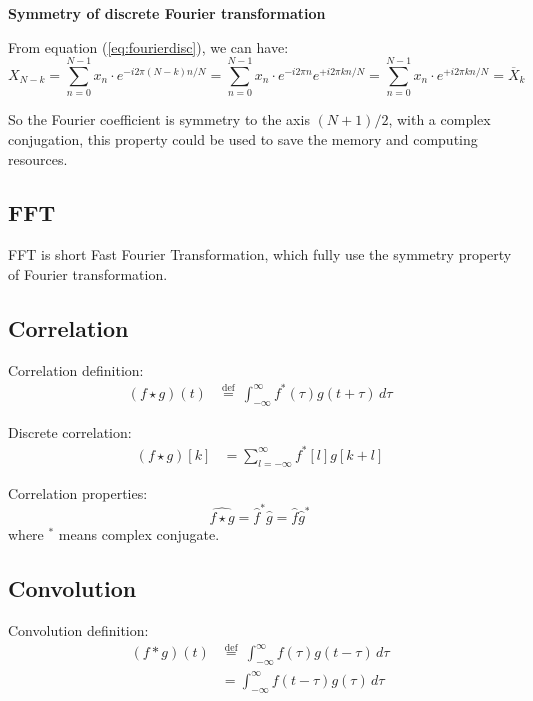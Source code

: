 \documentclass[12pt]{article}
\numberwithin{equation}{section}
\begin{document}
\textbf{Symmetry of discrete Fourier transformation} \par
From equation (\ref{eq:fourierdisc}), we can have:
\begin{equation}
	X_{N-k} = \sum_{n=0}^{N-1} x_n \cdot e^{-i2\pi (N-k)n/N} = \sum_{n=0}^{N-1} x_n \cdot e^{-i2\pi n} e^{+i2\pi kn/N} 
	= \sum_{n=0}^{N-1}  x_n \cdot e^{+i2\pi kn/N} = \overline{X}_k
\end{equation} \par
So the Fourier coefficient is symmetry to the axis $(N+1)/2$, with a complex conjugation, this property could be used to save the memory and computing resources. \par
\subsection{FFT}
FFT is short Fast Fourier Transformation, which fully use the symmetry property of Fourier transformation. \par
\subsection{Correlation}
Correlation definition:
\begin{align} \label{eq:conv}
	(f \star g )(t) &\stackrel{\mathrm{def}}{=}\ \int_{-\infty}^\infty f^*(\tau) g(t + \tau) \, d\tau 
\end{align} \par
Discrete correlation:
\begin{align}
	(f \star g)[k] &= \sum_{l=-\infty}^\infty f^*[l] g[k + l] 
\end{align} \par
Correlation properties:
\begin{equation} \label{eq:correlationproperty1}
	\widehat{f \star g}=\hat{f}^* \hat{g}=\hat{f} \hat{g}^*
\end{equation}
where $^*$ means complex conjugate. \par
\subsection{Convolution}
Convolution definition:
\begin{align} \label{eq:conv}
	(f * g )(t) &\stackrel{\mathrm{def}}{=}\ \int_{-\infty}^\infty f(\tau) g(t - \tau) \, d\tau \\
	&= \int_{-\infty}^\infty f(t-\tau) g(\tau)\, d\tau
\end{align} \par
\end{document}
